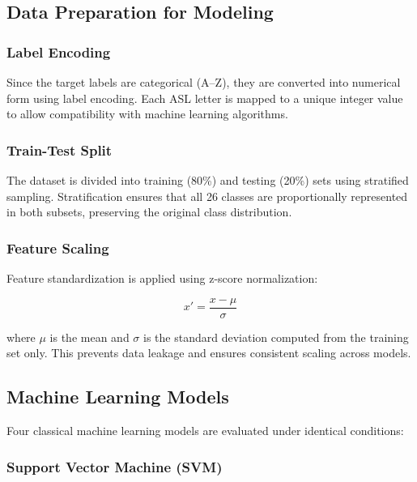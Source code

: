 \subsection{Data Preparation for Modeling}

\subsubsection{Label Encoding}

Since the target labels are categorical (A–Z), they are converted into numerical form using label encoding. Each ASL letter is mapped to a unique integer value to allow compatibility with machine learning algorithms.

\subsubsection{Train-Test Split}

The dataset is divided into training (80\%) and testing (20\%) sets using stratified sampling. Stratification ensures that all 26 classes are proportionally represented in both subsets, preserving the original class distribution.

\subsubsection{Feature Scaling}

Feature standardization is applied using z-score normalization:

\[
x' = \frac{x - \mu}{\sigma}
\]

where $\mu$ is the mean and $\sigma$ is the standard deviation computed from the training set only. This prevents data leakage and ensures consistent scaling across models.


\subsection{Machine Learning Models}

Four classical machine learning models are evaluated under identical conditions:

\subsubsection{Support Vector Machine (SVM)}

